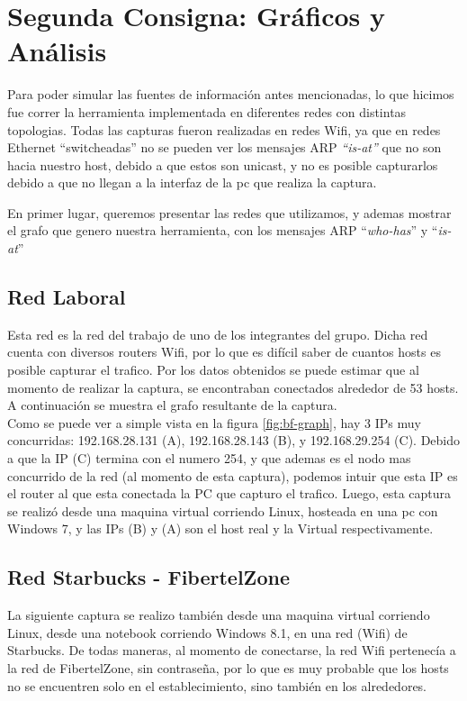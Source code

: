 \section{Segunda Consigna: Gráficos y Análisis}

Para poder simular las fuentes de información antes mencionadas, lo que hicimos fue correr la herramienta implementada en diferentes redes con distintas topologias. Todas las capturas fueron realizadas en redes Wifi, ya que en redes Ethernet ``switcheadas'' no se pueden ver los mensajes ARP \textit{``is-at''} que no son hacia nuestro host, debido a que estos son unicast, y no es posible capturarlos debido a que no llegan a la interfaz de la pc que realiza la captura. 

En primer lugar, queremos presentar las redes que utilizamos, y ademas mostrar el grafo que genero nuestra herramienta, con los mensajes ARP ``\textit{who-has}'' y ``\textit{is-at}''

\subsection{Red Laboral}

Esta red es la red del trabajo de uno de los integrantes del grupo. Dicha red cuenta con diversos routers Wifi, por lo que es difícil saber de cuantos hosts es posible capturar el trafico. Por los datos obtenidos se puede estimar que al momento de realizar la captura, se encontraban conectados alrededor de 53 hosts. A continuación se muestra el grafo resultante de la captura. \\

Como se puede ver a simple vista en la figura \ref{fig:bf-graph}, hay 3 IPs muy concurridas: 192.168.28.131 (A), 192.168.28.143 (B), y 192.168.29.254 (C). Debido a que la IP (C) termina con el numero 254, y que ademas es el nodo mas concurrido de la red (al momento de esta captura), podemos intuir que esta IP es el router al que esta conectada la PC que capturo el trafico. Luego, esta captura se realizó desde una maquina virtual corriendo Linux, hosteada en una pc con Windows 7, y las IPs (B) y (A) son el host real y la Virtual respectivamente.


\subsection{Red Starbucks - FibertelZone}

La siguiente captura se realizo también desde una maquina virtual corriendo Linux, desde una notebook corriendo Windows 8.1, en una red (Wifi) de Starbucks. De todas maneras, al momento de conectarse, la red Wifi pertenecía a la red de FibertelZone, sin contraseña, por lo que es muy probable que los hosts no se encuentren solo en el establecimiento, sino también en los alrededores. \\

